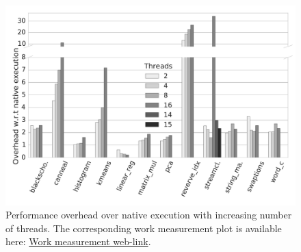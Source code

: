 
\begin{figure}[t]
\centering
\includegraphics[scale=0.25]{figure/benchmarks/times-Total_overheads.pdf}
\caption{Performance overhead  over native execution with increasing number of threads. The corresponding work measurement plot is available here: \href{https://mic92.github.io/inspector/index.html\#graph2}{Work measurement web-link}.}
\label{fig:overheads}
\end{figure}
